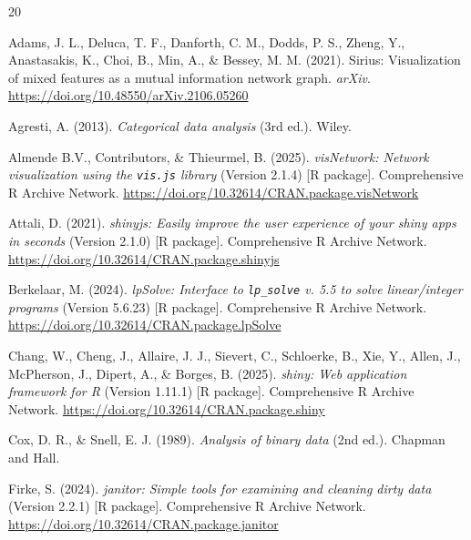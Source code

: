 \documentclass[11pt]{article}
\newcommand{\code}[1]{\texttt{#1}}
\newcommand{\pkg}[1]{\textsf{#1}}
\newcommand{\proglang}[1]{\textsf{#1}}
\newcommand{\doi}[1]{\href{https://doi.org/#1}{https://doi.org/#1}}
\begin{document}
\begin{thebibliography}{20}
\setlength{\itemsep}{0.5\baselineskip}

Adams, J. L., Deluca, T. F., Danforth, C. M., Dodds, P. S., Zheng, Y.,
Anastasakis, K., Choi, B., Min, A., \& Bessey, M. M. (2021).
\newblock Sirius: Visualization of mixed features as a mutual information
network graph.
\newblock \emph{arXiv}. \doi{10.48550/arXiv.2106.05260}

Agresti, A. (2013).
\newblock \emph{Categorical data analysis} (3rd ed.).
\newblock Wiley.

Almende B.V., Contributors, \& Thieurmel, B. (2025).
\newblock \emph{\pkg{visNetwork}: Network visualization using the \code{vis.js}
library} (Version 2.1.4) [\proglang{R} package].
\newblock Comprehensive \proglang{R} Archive Network. \doi{10.32614/CRAN.package.visNetwork}

Attali, D. (2021).
\newblock \emph{\pkg{shinyjs}: Easily improve the user experience of your
\pkg{shiny} apps in seconds} (Version 2.1.0) [\proglang{R} package].
\newblock Comprehensive \proglang{R} Archive Network. \doi{10.32614/CRAN.package.shinyjs}

Berkelaar, M. (2024).
\newblock \emph{\pkg{lpSolve}: Interface to \code{lp\_solve} v. 5.5 to solve
linear/integer programs} (Version 5.6.23) [\proglang{R} package].
\newblock Comprehensive \proglang{R} Archive Network. \doi{10.32614/CRAN.package.lpSolve}

Chang, W., Cheng, J., Allaire, J. J., Sievert, C., Schloerke, B., Xie, Y.,
Allen, J., McPherson, J., Dipert, A., \& Borges, B. (2025).
\newblock \emph{\pkg{shiny}: Web application framework for \proglang{R}}
(Version 1.11.1) [\proglang{R} package].
\newblock Comprehensive \proglang{R} Archive Network. \doi{10.32614/CRAN.package.shiny}

Cox, D. R., \& Snell, E. J. (1989).
\newblock \emph{Analysis of binary data} (2nd ed.).
\newblock Chapman and Hall.

Firke, S. (2024).
\newblock \emph{\pkg{janitor}: Simple tools for examining and cleaning dirty
data} (Version 2.2.1) [\proglang{R} package].
\newblock Comprehensive \proglang{R} Archive Network. \doi{10.32614/CRAN.package.janitor}


\end{thebibliography}
\end{document}
